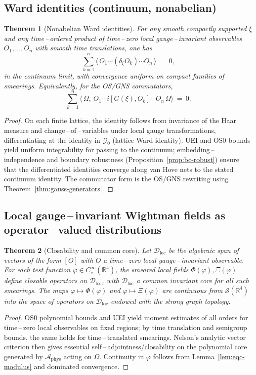 \documentclass[11pt]{amsart}
\theoremstyle{plain}
\newtheorem{theorem}{Theorem}[section]
\theoremstyle{definition}
\theoremstyle{remark}
\begin{document}
\subsection{Ward identities (continuum, nonabelian)}

\begin{theorem}[Nonabelian Ward identities]\label{thm:ward}
For any smooth compactly supported $\xi$ and any time\,–\,ordered product of time\,–\,zero local gauge\,–\,invariant observables $O_1,\dots,O_n$ with smooth time translations, one has
\[
  \sum_{k=1}^n \big\langle\, O_1\cdots (\delta_\xi O_k)\cdots O_n\,\big\rangle\ =\ 0,
\]
in the continuum limit, with convergence uniform on compact families of smearings. Equivalently, for the OS/GNS commutators,
\[
  \sum_{k=1}^n \langle\,\Omega,\ O_1\cdots i[ G(\xi), O_k ]\cdots O_n\,\Omega\rangle\ =\ 0.
\]
\end{theorem}
\begin{proof}
On each finite lattice, the identity follows from invariance of the Haar measure and change\,–\,of\,–\,variables under local gauge transformations, differentiating at the identity in $\mathcal G_0$ (lattice Ward identity). UEI and OS0 bounds yield uniform integrability for passing to the continuum; embedding\,–\,independence and boundary robustness (Proposition~\ref{prop:bc-robust}) ensure that the differentiated identities converge along van Hove nets to the stated continuum identity. The commutator form is the OS/GNS rewriting using Theorem~\ref{thm:gauss-generators}.
\end{proof}

\subsection{Local gauge\,–\,invariant Wightman fields as operator\,–\,valued distributions}

\begin{theorem}[Closability and common core]\label{thm:ovd}
Let $\mathcal D_{\mathrm{loc}}$ be the algebraic span of vectors of the form $[O]$ with $O$ a time\,–\,zero local gauge\,–\,invariant observable. For each test function $\varphi\in C_c^\infty(\mathbb R^4)$, the smeared local fields $\Phi(\varphi),\Xi(\varphi)$ define closable operators on $\mathcal D_{\mathrm{loc}}$, with $\mathcal D_{\mathrm{loc}}$ a common invariant core for all such smearings. The maps $\varphi\mapsto \Phi(\varphi)$ and $\varphi\mapsto \Xi(\varphi)$ are continuous from $\mathcal S(\mathbb R^4)$ into the space of operators on $\mathcal D_{\mathrm{loc}}$ endowed with the strong graph topology.
\end{theorem}
\begin{proof}
OS0 polynomial bounds and UEI yield moment estimates of all orders for time\,–\,zero local observables on fixed regions; by time translation and semigroup bounds, the same holds for time\,–\,translated smearings. Nelson's analytic vector criterion then gives essential self\,–\,adjointness/closability on the polynomial core generated by $\mathcal A_{\mathrm{phys}}$ acting on $\Omega$. Continuity in $\varphi$ follows from Lemma~\ref{lem:eqc-modulus} and dominated convergence.
\end{proof}
\end{document}
